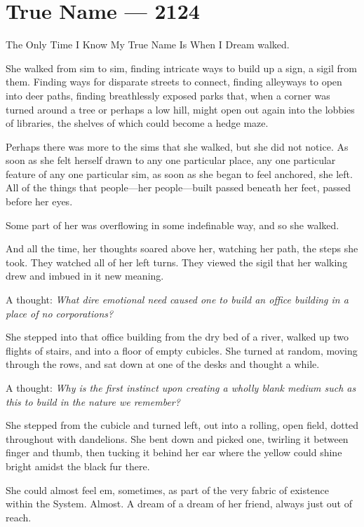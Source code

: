 \hypertarget{true-name-2124}{%
\chapter{True Name — 2124}\label{true-name-2124}}

The Only Time I Know My True Name Is When I Dream walked.

She walked from sim to sim, finding intricate ways to build up a sign, a sigil from them. Finding ways for disparate streets to connect, finding alleyways to open into deer paths, finding breathlessly exposed parks that, when a corner was turned around a tree or perhaps a low hill, might open out again into the lobbies of libraries, the shelves of which could become a hedge maze.

Perhaps there was more to the sims that she walked, but she did not notice. As soon as she felt herself drawn to any one particular place, any one particular feature of any one particular sim, as soon as she began to feel anchored, she left. All of the things that people---her people---built passed beneath her feet, passed before her eyes.

Some part of her was overflowing in some indefinable way, and so she walked.

And all the time, her thoughts soared above her, watching her path, the steps she took. They watched all of her left turns. They viewed the sigil that her walking drew and imbued in it new meaning.

A thought: \emph{What dire emotional need caused one to build an office building in a place of no corporations?}

She stepped into that office building from the dry bed of a river, walked up two flights of stairs, and into a floor of empty cubicles. She turned at random, moving through the rows, and sat down at one of the desks and thought a while.

A thought: \emph{Why is the first instinct upon creating a wholly blank medium such as this to build in the nature we remember?}

She stepped from the cubicle and turned left, out into a rolling, open field, dotted throughout with dandelions. She bent down and picked one, twirling it between finger and thumb, then tucking it behind her ear where the yellow could shine bright amidst the black fur there.

She could almost feel em, sometimes, as part of the very fabric of existence within the System. Almost. A dream of a dream of her friend, always just out of reach.

